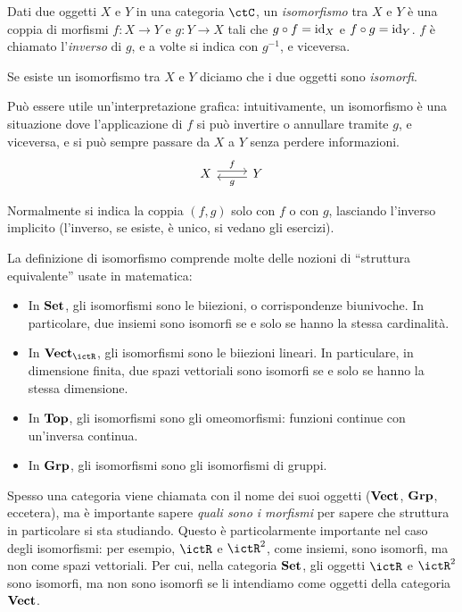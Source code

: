 \begin{definition}
 Dati due oggetti $X$ e $Y$ in una categoria $\ctC$, un \emph{isomorfismo} tra $X$ e $Y$ è una coppia di morfismi $f:X\to Y$ e $g:Y\to X$ tali che $g\circ f=\mathrm{id}_X$ e $f\circ g=\mathrm{id}_Y$.
 $f$ è chiamato l'\emph{inverso} di $g$, e a volte si indica con $g^{-1}$, e viceversa.

 Se esiste un isomorfismo tra $X$ e $Y$ diciamo che i due oggetti sono \emph{isomorfi}.
\end{definition}

Può essere utile un'interpretazione grafica: intuitivamente, un isomorfismo è una situazione dove l'applicazione di $f$ si può invertire o annullare tramite $g$, e viceversa, e si può sempre passare da $X$ a $Y$ senza perdere informazioni.
\[
\begin{tikzcd}
 X \ar[shift left]{r}{f} & Y \ar[shift left]{l}{g}
\end{tikzcd}
\]

Normalmente si indica la coppia $(f,g)$ solo con $f$ o con $g$, lasciando l'inverso implicito (l'inverso, se esiste, è unico, si vedano gli esercizi).

\begin{examples}
 La definizione di isomorfismo comprende molte delle nozioni di ``struttura equivalente'' usate in matematica:
 \begin{itemize}
  \item In $\mathbf{Set}$, gli isomorfismi sono le biiezioni, o corrispondenze biunivoche. In particolare, due insiemi sono isomorfi se e solo se hanno la stessa cardinalità.
  \item In $\ctVect_\ictR$, gli isomorfismi sono le biiezioni lineari. In particulare, in dimensione finita, due spazi vettoriali sono isomorfi se e solo se hanno la stessa dimensione.
  \item In $\mathbf{Top}$, gli isomorfismi sono gli omeomorfismi: funzioni continue con un'inversa continua.
  \item In $\mathbf{Grp}$, gli isomorfismi sono gli isomorfismi di gruppi.
 \end{itemize}
\end{examples}

\begin{warning}
 Spesso una categoria viene chiamata con il nome dei suoi oggetti ($\mathbf{Vect}$, $\mathbf{Grp}$, eccetera), ma è importante sapere \emph{quali sono i morfismi} per sapere che struttura in particolare si sta studiando. Questo è particolarmente importante nel caso degli isomorfismi: per esempio, $\ictR$ e $\ictR^2$, come insiemi, sono isomorfi, ma non come spazi vettoriali. Per cui, nella categoria $\mathbf{Set}$, gli oggetti $\ictR$ e $\ictR^2$ sono isomorfi, ma non sono isomorfi se li intendiamo come oggetti della categoria $\mathbf{Vect}$.
\end{warning}

